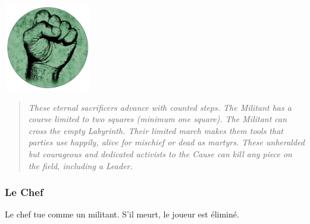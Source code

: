 \documentclass{article}
\begin{document}
\vspace{10pt} %
\noindent %
\begin{minipage}{0.3\textwidth} %
\includegraphics[width=1.5in,height=1.5in]{media/image10.png}
\end{minipage}%
\hfill %
\begin{minipage}{0.75\textwidth} %

\begin{quote}
\textit{These eternal sacrificers advance with counted steps. The Militant has a
course limited to two squares (minimum one square). The Militant can
cross the empty Labyrinth. Their limited march makes them tools that
parties use happily, alive for mischief or dead as martyrs.
These unheralded but courageous and dedicated activists to the Cause can
kill any piece on the field, including a Leader.}
\end{quote}
\end{minipage}
\vspace{20pt} %



\subsubsection{Le Chef}
Le chef tue comme un militant. S'il meurt, le joueur est éliminé.
\end{document}
